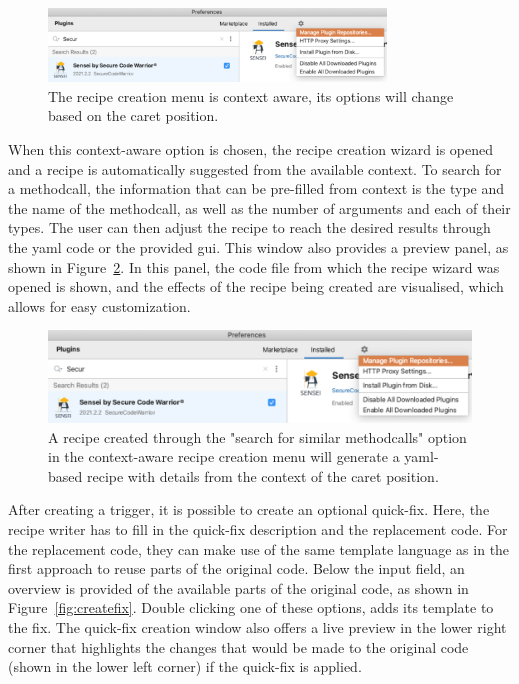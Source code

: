 \begin{figure}[t]
  \centering
  \includegraphics[width=0.8\textwidth,page=11]{04-tools/figures/figures2.pdf}
  \caption[Context-aware recipe creation menu]{The recipe creation menu is context aware, its options will change based on the caret position.}
  \label{fig:newrecipemethodcall} 
\end{figure}

When this context-aware option is chosen, the recipe creation wizard is opened and a recipe is automatically suggested from the available context.
To search for a methodcall, the information that can be pre-filled from context is the type and the name of the methodcall, as well as the number of arguments and each of their types.
The user can then adjust the recipe to reach the desired results through the \gls{yaml} code or the provided \gls{gui}.
This window also provides a preview panel, as shown in Figure~\ref{fig:recipewizard1}.
In this panel, the code file from which the recipe wizard was opened is shown, and the effects of the recipe being created are visualised, which allows for easy customization.

\begin{figure}
  \centering
  \includegraphics[width=\textwidth,page=10]{04-tools/figures/figures2.pdf}
  \caption[Recipe created from context]{A recipe created through the "search for similar methodcalls" option in the context-aware recipe creation menu will generate a \gls{yaml}-based recipe with details from the context of the caret position.}
  \label{fig:recipewizard1} 
\end{figure}

After creating a trigger, it is possible to create an optional quick-fix.
Here, the recipe writer has to fill in the quick-fix description and the replacement code.
For the replacement code, they can make use of the same template language as in the first approach to reuse parts of the original code.
Below the input field, an overview is provided of the available parts of the original code, as shown in Figure~\ref{fig:createfix}.
Double clicking one of these options, adds its template to the fix.
The quick-fix creation window also offers a live preview in the lower right corner that highlights the changes that would be made to the original code (shown in the lower left corner) if the quick-fix is applied.

